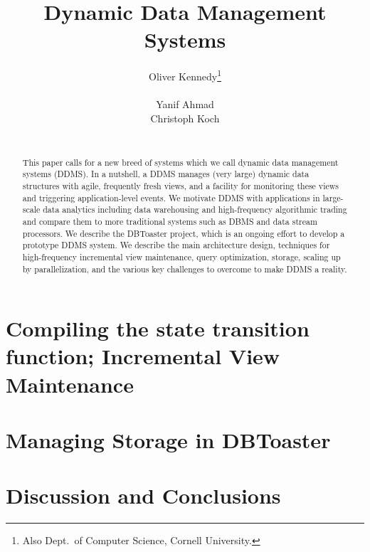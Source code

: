 \documentclass{sig-alternate}
\begin{document}
\title{Dynamic Data Management Systems}
\author{
\alignauthor
Oliver Kennedy\thanks{Also Dept.\ of Computer Science, Cornell University.}\\
     \\
\alignauthor
Yanif Ahmad\\
\alignauthor
Christoph Koch\\
     \\
}
\maketitle

\begin{abstract}
This paper calls for a new breed of systems which
we call dynamic data management systems (DDMS). In a nutshell,
a DDMS manages (very large) dynamic data structures with 
agile, frequently fresh views, and a facility for monitoring
these views and triggering application-level events.
%
We motivate DDMS with applications in large-scale data analytics
including data warehousing and high-frequency algorithmic trading
and compare them to more traditional systems such as DBMS and
data stream processors.
%
We describe the DBToaster project, which is an ongoing effort to
develop a prototype DDMS system. We describe the main architecture
design, techniques for high-frequency incremental view maintenance,
query optimization, storage, scaling up by parallelization, and
the various key challenges to overcome to make DDMS a reality.
\end{abstract}






\section{Compiling the state transition function; Incremental View Maintenance}




\section{Managing Storage in DBToaster}


\section{Discussion and Conclusions}



\end{document}
